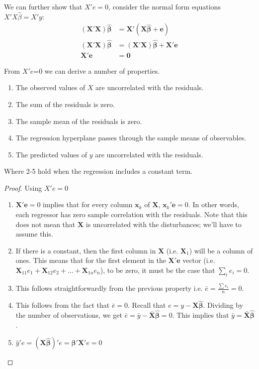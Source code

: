 \documentclass[DIV=14,titlepage=false]{scrreprt}
\begin{document}
We can further show that $X'e=0$, consider the normal form equations $X'X\hat\beta=X'y$:
\begin{align*}
    (\mathbf{X}'\mathbf{X})\hat{\boldsymbol{\beta}} &= \mathbf{X}'(\mathbf{X}\hat{\boldsymbol{\beta}} + \mathbf{e}) \\
    (\mathbf{X}'\mathbf{X})\hat{\boldsymbol{\beta}} &= (\mathbf{X}'\mathbf{X})\hat{\boldsymbol{\beta}} + \mathbf{X}'\mathbf{e} \\
    \mathbf{X}'\mathbf{e} &= \mathbf{0}
\end{align*}
\begin{prop}
From $X'e$=0 we can derive a number of properties.
\begin{enumerate}
    \item The observed values of $X$ are uncorrelated with the residuals.
    \item The sum of the residuals is zero.
    \item The sample mean of the residuals is zero.
    \item The regression hyperplane passes through the sample means of observables.
    \item The predicted values of $y$ are uncorrelated with the residuals.
\end{enumerate}
Where 2-5 hold when the regression includes a constant term.
\end{prop}
\begin{proof} Using $X'e=0$
\begin{enumerate}
    \item $\mathbf{X}'\mathbf{e} = 0$ implies that for every column $\mathbf{x}_k$ of $\mathbf{X}$, $\mathbf{x}_k'\mathbf{e} = 0$. In other words, each regressor has zero sample correlation with the residuals. Note that this does not mean that $\mathbf{X}$ is uncorrelated with the disturbances; we'll have to assume this.
    \item  If there is a constant, then the first column in \(\mathbf{X}\) (i.e. \(\mathbf{X}_1\)) will be a column of ones. This means that for the first element in the \(\mathbf{X}'\mathbf{e}\) vector (i.e. \(\mathbf{X}_{11} e_1 + \mathbf{X}_{12} e_2 + \ldots + \mathbf{X}_{1n} e_n\)), to be zero, it must be the case that \(\sum_{i} e_i = 0\).
    \item     This follows straightforwardly from the previous property i.e. \(\bar{e} = \frac{\sum e_i}{n} = 0\).
    \item     This follows from the fact that \(\bar{e} = 0\). Recall that \(e = y - \mathbf{X}\hat{\boldsymbol{\beta}}\). Dividing by the number of observations, we get \(\bar{e} = \bar{y} - \bar{\mathbf{X}}\hat{\boldsymbol{\beta}} = 0\). This implies that \(\bar{y} = \bar{\mathbf{X}}\hat{\boldsymbol{\beta}}\).
    \item     \(\hat{y}'e = (\mathbf{X}\hat{\boldsymbol{\beta}})'e = \hat{\boldsymbol{\beta}}'\mathbf{X}'e = 0\) 
\end{enumerate}
\end{proof}
\end{document}
